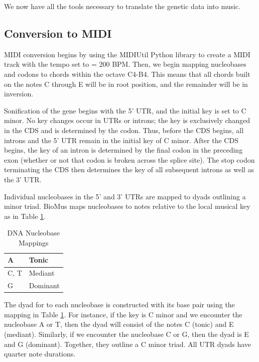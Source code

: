 \documentclass[letterpaper]{article}
\begin{document}
We now have all the tools necessary to translate the genetic data into music.

\subsection{Conversion to MIDI}

MIDI conversion begins by using the MIDIUtil Python library to create a MIDI track with the tempo set to \musQuarter\;= 200 BPM. Then, we begin mapping nucleobases and codons to chords within the octave C4-B4. This means that all chords built on the notes C through E will be in root position, and the remainder will be in inversion.

Sonification of the gene begins with the 5' UTR, and the initial key is set to C minor. No key changes occur in UTRs or introns; the key is exclusively changed in the CDS and is determined by the codon. Thus, before the CDS begins, all introns and the 5' UTR remain in the initial key of C minor. After the CDS begins, the key of an intron is determined by the final codon in the preceding exon (whether or not that codon is broken across the splice site). The stop codon terminating the CDS then determines the key of all subsequent introns as well as the 3' UTR.


Individual nucleobases in the 5' and 3' UTRs are mapped to dyads outlining a minor triad. BioMus maps nucleobases to notes relative to the local musical key as in Table  \ref{table:nucleobases}.

\begin{table}[h!]
\centering
\vspace{-2mm}
\begin{tabular}{|l|l|}
\hline
A   & Tonic    \\ \hline
C, T & Mediant  \\ \hline
G   & Dominant \\ \hline
\end{tabular}
\caption{DNA Nucleobase Mappings}
\vspace{-6mm}
\label{table:nucleobases}
\end{table}

The dyad for to each nucleobase is constructed with its base pair using the mapping in Table  \ref{table:nucleobases}. For instance, if the key is C minor and we encounter the nucleobase A or T, then the dyad will consist of the notes C (tonic) and E\musFlat \; (mediant). Similarly, if we encounter the nucleobase C or G, then the dyad is E\musFlat \; and G (dominant). Together, they outline a C minor triad. All UTR dyads have quarter note durations.
\end{document}
